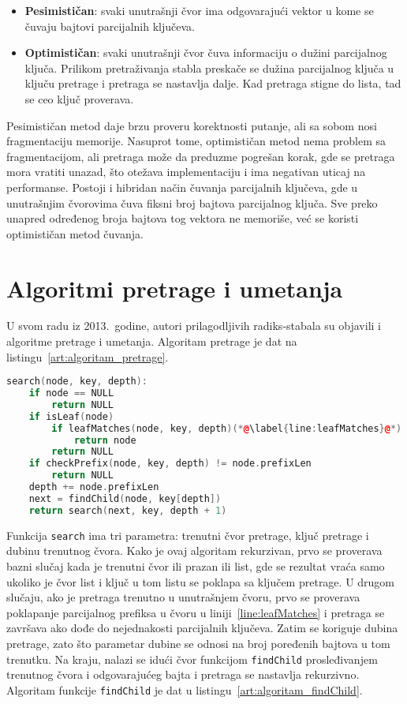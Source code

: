 \documentclass[12pt,oneside]{memoir}
\begin{document}
\begin{itemize}
  \item \textbf{Pesimističan}: svaki unutrašnji čvor ima odgovarajući vektor
        u kome se čuvaju bajtovi parcijalnih ključeva.
  \item \textbf{Optimističan}: svaki unutrašnji čvor čuva informaciju o dužini
        parcijalnog ključa. Prilikom pretraživanja stabla preskače se dužina
        parcijalnog ključa u ključu pretrage i pretraga se nastavlja dalje.
        Kad pretraga stigne do lista, tad se ceo ključ proverava.
\end{itemize}

Pesimističan metod daje brzu proveru korektnosti putanje, ali sa sobom nosi
fragmentaciju memorije. Nasuprot tome, optimističan metod nema problem sa
fragmentacijom, ali pretraga može da preduzme pogrešan korak, gde se
pretraga mora vratiti unazad, što otežava implementaciju i ima negativan
uticaj na performanse. Postoji i hibridan način čuvanja parcijalnih ključeva,
gde u unutrašnjim čvorovima čuva fiksni broj bajtova parcijalnog ključa. Sve
preko unapred određenog broja bajtova tog vektora ne memoriše, već se koristi
optimističan metod čuvanja.

\section{Algoritmi pretrage i umetanja}

U svom radu iz 2013.\ godine, autori prilagodljivih radiks-stabala su
objavili i algoritme pretrage i umetanja. Algoritam pretrage je dat na
listingu~\ref{art:algoritam_pretrage}.

\begin{lstlisting}[language=C++,
                   caption={Algoritam pretrage strukture podataka ART},
                   label={art:algoritam_pretrage}]
search(node, key, depth):
    if node == NULL
        return NULL
    if isLeaf(node)
        if leafMatches(node, key, depth)(*@\label{line:leafMatches}@*)
            return node
        return NULL
    if checkPrefix(node, key, depth) != node.prefixLen
        return NULL
    depth += node.prefixLen
    next = findChild(node, key[depth])
    return search(next, key, depth + 1)
\end{lstlisting}

Funkcija \texttt{search} ima tri parametra: trenutni čvor pretrage, ključ
pretrage i dubinu trenutnog čvora. Kako je ovaj algoritam rekurzivan,
prvo se proverava bazni slučaj kada je trenutni čvor ili prazan ili
list, gde se rezultat vraća samo ukoliko je čvor list i ključ u tom listu
se poklapa sa ključem pretrage. U drugom slučaju, ako je pretraga trenutno
u unutrašnjem čvoru, prvo se proverava poklapanje parcijalnog prefiksa
u čvoru u liniji~\ref{line:leafMatches} i pretraga se završava ako dođe
do nejednakosti parcijalnih ključeva. Zatim se koriguje dubina pretrage,
zato što parametar dubine se odnosi na broj poređenih bajtova u tom trenutku.
Na kraju, nalazi se idući čvor funkcijom \texttt{findChild} prosleđivanjem
trenutnog čvora i odgovarajućeg bajta i pretraga se
nastavlja rekurzivno. Algoritam funkcije \texttt{findChild} je dat u
listingu~\ref{art:algoritam_findChild}.
\end{document}
